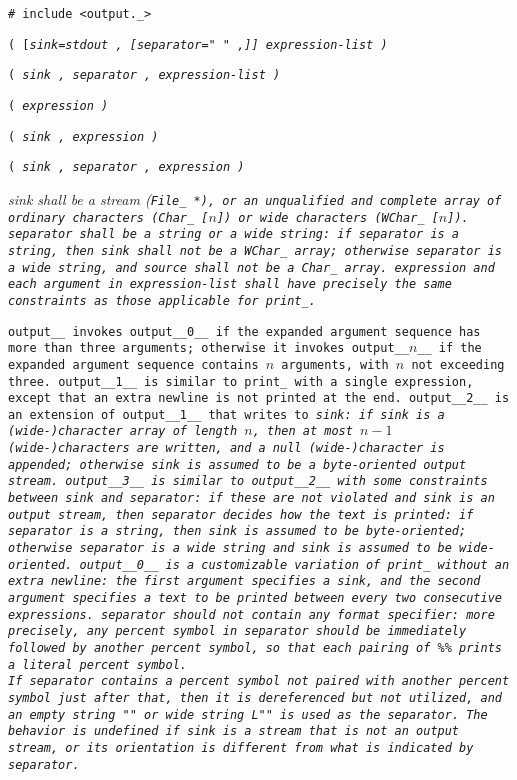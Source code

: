 
\tt{# include <output._>}

\s\s\s\s\tt{(} [\it{sink}\tt{=stdout} \tt{,}
[\it{separator}\tt{=" "} \tt{,}]] \it{expression-list} \tt{)}

\s\tt{(} \it{sink} \tt{,}
\it{separator} \tt{,} \it{expression-list} \tt{)}

\s\tt{(} \it{expression} \tt{)}

\s\tt{(} \it{sink} \tt{,} \it{expression} \tt{)}

\s\tt{(} \it{sink} \tt{,} \it{separator} \tt{,} \it{expression} \tt{)}


\it{sink} shall be a stream (\tt{File_ *}),
or an unqualified and complete array of ordinary characters
(\tt{Char_ [}$n$\tt{]}) or wide characters (\tt{WChar_ [}$n$\tt{]}).
\it{separator} shall be a string or a wide string: if \it{separator} is a string,
then \it{sink} shall not be a \tt{WChar_} array; otherwise \it{separator}
is a wide string, and \it{source} shall not be a \tt{Char_} array.
\it{expression} and each argument in \it{expression-list} shall have
precisely the same constraints as those applicable for \tt{print_}.


\tt{output__} invokes \tt{output__0__} if the expanded argument sequence has
more than three arguments; otherwise it invokes \tt{output__}$n$\tt{__} if the
expanded argument sequence contains $n$ arguments, with $n$ not exceeding three.
\tt{output__1__} is similar to \tt{print_} with a single expression,
except that an extra newline is not printed at the end.
\tt{output__2__} is an extension of \tt{output__1__} that writes to \it{sink}:
if sink is a (wide-)character array of length $n$, then at most $n - 1$
(wide-)characters are written, and a null (wide-)character is appended;
otherwise \it{sink} is assumed to be a byte-oriented output stream.
\tt{output__3__} is similar to \tt{output__2__} with some constraints between
\it{sink} and \it{separator}: if these are not violated and \it{sink} is
an output stream, then \it{separator} decides how the text is printed:
if \it{separator} is a string, then \it{sink} is assumed to be byte-oriented;
otherwise \it{separator} is a wide string and \it{sink} is assumed to be wide-oriented.
\tt{output__0__} is a customizable variation of \tt{print_} without an extra
newline: the first argument specifies a \it{sink}, and the second argument
specifies a text to be printed between every two consecutive expressions.
\it{separator} should not contain any format specifier: more precisely, any
percent symbol in \it{separator} should be immediately followed by another
percent symbol, so that each pairing of \tt{\%\%} prints a literal percent symbol.\\
If \it{separator} contains a percent symbol not paired with another percent
symbol just after that, then it is dereferenced but not utilized, and
an empty string \tt{""} or wide string \tt{L""} is used as the separator.
The behavior is undefined if \it{sink} is a stream that is not an output stream,
or its orientation is different from what is indicated by \it{separator}.

